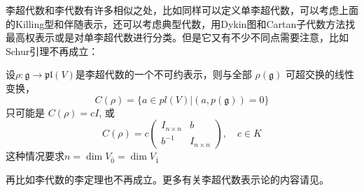 李超代数和李代数有许多相似之处，比如同样可以定义单李超代数，可以考虑上面的Killing型和伴随表示，还可以考虑典型代数，用Dykin图和Cartan子代数方法找最高权表示或是对单李超代数进行分类。但是它又有不少不同点需要注意，比如Schur引理不再成立：
\begin{theorem}[超Schur引理]
	设$\rho:\mathfrak{g}\longrightarrow\mathfrak{pl}(V)$是李超代数的一个不可约表示，则与全部 $\rho(\mathfrak{g})$ 可超交换的线性变换，
	$$C(\rho)=\{a\in pl(V)|(a,p(\mathfrak{g}))=0\}$$
	只可能是 $C(\rho)=cI$, 或
	\[C(\rho)=c\begin{pmatrix}I_{n\times n}&b\\b^{-1}&I_{n\times n}\end{pmatrix},\quad c\in K\]
	这种情况要求$n=\dim V_{\bar 0}=\dim V_{\bar 1}$
\end{theorem}
再比如李代数的李定理也不再成立。更多有关李超代数表示论的内容请见\cite{superlie,WLXJ198301002,Kac:1977em}。